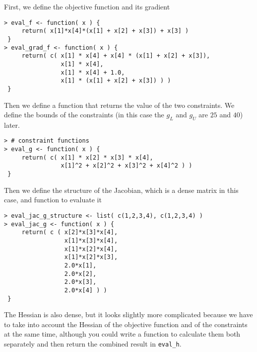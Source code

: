 \documentclass[10pt]{article}
\begin{document}
First, we define the objective function and its gradient
\begin{verbatim}
> eval_f <- function( x ) { 
     return( x[1]*x[4]*(x[1] + x[2] + x[3]) + x[3] ) 
 }
> eval_grad_f <- function( x ) {
     return( c( x[1] * x[4] + x[4] * (x[1] + x[2] + x[3]),
                x[1] * x[4],
                x[1] * x[4] + 1.0,
                x[1] * (x[1] + x[2] + x[3]) ) )		  
 }
\end{verbatim}
Then we define a function that returns the value of the two constraints. We 
define the bounds of the constraints (in this case the $g_L$ and $g_U$ are 
$25$ and $40$) later.
\begin{verbatim}
> # constraint functions
> eval_g <- function( x ) {
     return( c( x[1] * x[2] * x[3] * x[4],
                x[1]^2 + x[2]^2 + x[3]^2 + x[4]^2 ) )
 }
\end{verbatim}
Then we define the structure of the Jacobian, which is a dense matrix in this 
case, and function to evaluate it
\begin{verbatim}
> eval_jac_g_structure <- list( c(1,2,3,4), c(1,2,3,4) )
> eval_jac_g <- function( x ) {
     return( c ( x[2]*x[3]*x[4],
                 x[1]*x[3]*x[4],
                 x[1]*x[2]*x[4],
                 x[1]*x[2]*x[3],
                 2.0*x[1],
                 2.0*x[2],
                 2.0*x[3],
                 2.0*x[4] ) )
 }
\end{verbatim}
The Hessian is also dense, but it looks slightly more complicated because we 
have to take into account the Hessian of the objective function and of the 
constraints at the same time, although you could write a function to calculate 
them both separately and then return the combined result in \texttt{eval\_h}.
\end{document}
